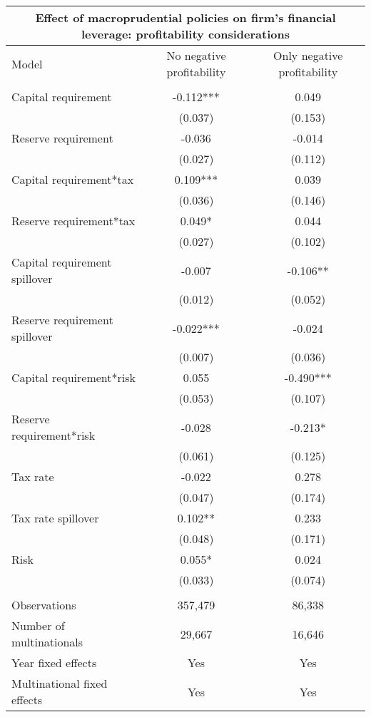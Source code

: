 \begin{tabular}{lcc}
\multicolumn{3}{c}{Effect of macroprudential policies on firm's financial leverage: profitability considerations} \\ \hline
Model & No negative profitability & Only negative profitability \\ \hline
 &  &  \\
Capital requirement & -0.112*** & 0.049 \\
 & (0.037) & (0.153) \\
Reserve requirement & -0.036 & -0.014 \\
 & (0.027) & (0.112) \\
Capital requirement*tax & 0.109*** & 0.039 \\
 & (0.036) & (0.146) \\
Reserve requirement*tax & 0.049* & 0.044 \\
 & (0.027) & (0.102) \\
Capital requirement spillover & -0.007 & -0.106** \\
 & (0.012) & (0.052) \\
Reserve requirement spillover & -0.022*** & -0.024 \\
 & (0.007) & (0.036) \\
Capital requirement*risk & 0.055 & -0.490*** \\
 & (0.053) & (0.107) \\
Reserve requirement*risk & -0.028 & -0.213* \\
 & (0.061) & (0.125) \\
Tax rate & -0.022 & 0.278 \\
 & (0.047) & (0.174) \\
Tax rate spillover & 0.102** & 0.233 \\
 & (0.048) & (0.171) \\
Risk & 0.055* & 0.024 \\
 & (0.033) & (0.074) \\

 &  &  \\
Observations & 357,479 & 86,338 \\
Number of multinationals & 29,667 & 16,646 \\
Year fixed effects & Yes & Yes \\
Multinational fixed effects & Yes & Yes \\
 \hline
\end{tabular}
